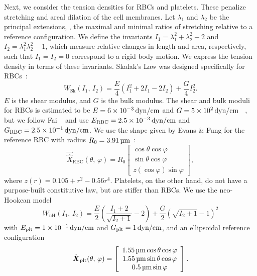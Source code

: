 Next, we consider the tension densities for RBCs and platelets. These penalize stretching
and areal dilation of the cell membranes. Let $\lambda_1$ and $\lambda_2$ be the
principal extensions, , the maximal and minimal ratios of stretching relative
to a reference configuration. We define the invariants $I_1=\lambda_1^2+\lambda_2^2-2$
and $I_2 = \lambda_1^2\lambda_2^2-1$, which measure relative changes in length and area,
respectively, such that $I_1 = I_2 = 0$ correspond to a rigid body motion. We express the
tension density in terms of these invariants. Skalak's Law was designed specifically for
RBCs~\cite{Skalak:1973tp}:
\begin{equation}\label{eq:skalak-law}
    W_\text{Sk}(I_1,\,I_2) = \frac{E}4\left(I_1^2 + 2I_1 - 2I_2\right) + \frac{G}4 I_2^2.
\end{equation}
$E$ is the shear modulus, and $G$ is the bulk modulus. The shear and bulk moduli for RBCs
is estimated to be $E = 6\times 10^{-3}\dynpercm$ and $G = 5\times 10^2 \dynpercm$~%
\cite{Mohandas:1994tg}, but we follow Fai ~\cite{Fai:2013do} and use
$\rbc{E} = 2.5\times 10^{-3}\dynpercm$ and $\rbc{G} = 2.5\times 10^{-1}\dynpercm$. We use
the shape given by Evans \& Fung for the reference RBC with
radius $R_0 = 3.91\um$~\cite{Evans:1972uf}:
\begin{equation*}
    \vec{\hat{X}}_\text{RBC}(\theta,\,\varphi) = R_0\left[\begin{array}{c}
            \cos\theta\cos\varphi \\
            \sin\theta\cos\varphi \\
            z(\cos\varphi)\sin\varphi
    \end{array}\right],
\end{equation*}
where $z(r) = 0.105 + r^2 - 0.56r^4$. Platelets, on the other hand, do not have a
purpose-built constitutive law, but are stiffer than RBCs. We use the neo-Hookean model
\begin{equation}\label{eq:neohookean}
    W_\text{nH}(I_1,\,I_2) = \frac{E}2\left(\frac{I_1+2}{\sqrt{I_2+1}}-2\right) + \frac{G}2 \left(\sqrt{I_2+1}-1\right)^2
\end{equation}
with $\plt{E} = 1\times 10^{-1}\dynpercm$ and $\plt{G} = 1\dynpercm$, and an ellipsoidal
reference configuration~\cite{Frojmovic:1982wk}
\begin{equation*}
    \plt{\hat{\vec{X}}}(\theta,\,\varphi) = \left[\begin{array}{c}
            1.55\um\cos\theta\cos\varphi \\
            1.55\um\sin\theta\cos\varphi \\
            0.5\um\sin\varphi
    \end{array}\right].
\end{equation*}


